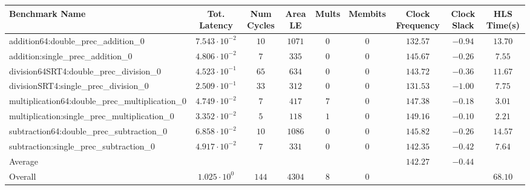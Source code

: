 \begin{tabular}{|l|c|c|c|c|c|c|c|c|}
\hline
Benchmark Name                                   & Tot. Latency            & Num Cycles & Area LE  & Mults & Membits & Clock Frequency & Clock Slack & HLS Time(s) \\
\hline
addition64:double\_prec\_addition\_0             & $ 7.543 \cdot 10^{-2} $ & $ 10     $ & $ 1071 $ & $ 0 $ & $ 0   $ & $ 132.57      $ & $ -0.94   $ & $ 13.70   $ \\
addition:single\_prec\_addition\_0               & $ 4.806 \cdot 10^{-2} $ & $ 7      $ & $ 335  $ & $ 0 $ & $ 0   $ & $ 145.67      $ & $ -0.26   $ & $ 7.55    $ \\
division64SRT4:double\_prec\_division\_0         & $ 4.523 \cdot 10^{-1} $ & $ 65     $ & $ 634  $ & $ 0 $ & $ 0   $ & $ 143.72      $ & $ -0.36   $ & $ 11.67   $ \\
divisionSRT4:single\_prec\_division\_0           & $ 2.509 \cdot 10^{-1} $ & $ 33     $ & $ 312  $ & $ 0 $ & $ 0   $ & $ 131.53      $ & $ -1.00   $ & $ 7.75    $ \\
multiplication64:double\_prec\_multiplication\_0 & $ 4.749 \cdot 10^{-2} $ & $ 7      $ & $ 417  $ & $ 7 $ & $ 0   $ & $ 147.38      $ & $ -0.18   $ & $ 3.01    $ \\
multiplication:single\_prec\_multiplication\_0   & $ 3.352 \cdot 10^{-2} $ & $ 5      $ & $ 118  $ & $ 1 $ & $ 0   $ & $ 149.16      $ & $ -0.10   $ & $ 2.21    $ \\
subtraction64:double\_prec\_subtraction\_0       & $ 6.858 \cdot 10^{-2} $ & $ 10     $ & $ 1086 $ & $ 0 $ & $ 0   $ & $ 145.82      $ & $ -0.26   $ & $ 14.57   $ \\
subtraction:single\_prec\_subtraction\_0         & $ 4.917 \cdot 10^{-2} $ & $ 7      $ & $ 331  $ & $ 0 $ & $ 0   $ & $ 142.35      $ & $ -0.42   $ & $ 7.64    $ \\
\hline
Average                                          & $                     $ & $        $ & $      $ & $   $ & $     $ & $ 142.27      $ & $ -0.44   $ & $         $ \\
\hline
Overall                                          & $ 1.025 \cdot 10^{0}  $ & $ 144    $ & $ 4304 $ & $ 8 $ & $ 0   $ & $             $ & $         $ & $ 68.10   $ \\
\hline
\end{tabular}
